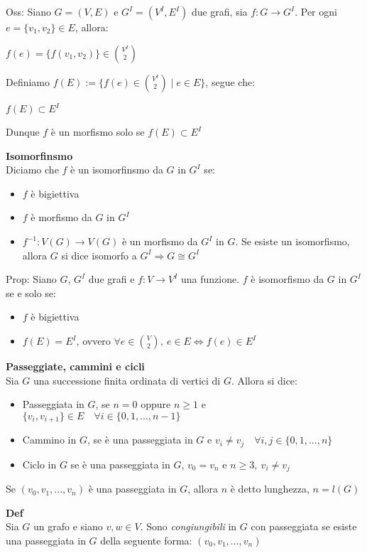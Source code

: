 \documentclass[11pt, letterpaper]{article}
\begin{document}
Oss: Siano $G=(V,E)$ e $G^{I}=(V^{I},E^{I})$ due grafi, sia $f:G\rightarrow G^{I}$. Per ogni 
$e=\{v_{1},v_{2}\}\in E$, allora:
\begin{center}
    $f(e)=\{f(v_{1},v_{2})\}\in\binom{V^{I}}{2}$
\end{center}
Definiamo $f(E):=\{f(e)\in\binom{V^{I}}{2}\mid e\in E\}$, segue che:
\begin{center}
    $f(E)\subset E^{I}$
\end{center}
Dunque $f$ è un morfismo solo se $f(E)\subset E^{I}$

\textbf{Isomorfinsmo}\\ Diciamo che $f$ è un isomorfinsmo da $G$ in $G^{I}$ se:
\begin{itemize}
    \item $f$ è bigiettiva
    \item $f$ è morfismo da $G$ in $G^{I}$
    \item $f^{-1}:V(G)\rightarrow V(G)$ è un morfismo da $G^{I}$ in $G$. Se esiste un isomorfismo, allora
    $G$ si dice isomorfo a $G^{I}\Rightarrow G\cong G^{I}$
\end{itemize}

Prop: Siano $G$, $G^{I}$ due grafi e $f:V\rightarrow V^{I}$ una funzione. $f$ è isomorfismo da $G$ in $G^{I}$ 
se e solo se:
\begin{itemize}
    \item $f$ è bigiettiva
    \item $f(E)=E^{I}$, ovvero $\forall e\in\binom{V}{2},\ e\in E\Leftrightarrow f(e)\in E^{I}$
\end{itemize}

\newpage
\textbf{Passeggiate, cammini e cicli}\\ Sia $G$ una successione finita ordinata di vertici di $G$. Allora si dice:
\begin{itemize}
    \item Passeggiata in $G$, se $n=0$ oppure $n\geq 1$ e $\{v_{i},v_{i+1}\}\in E\quad\forall i\in\{0,1,...,n-1\}$
    \item Cammino in $G$, se è una passeggiata in $G$ e $v_{i}\neq v_{j}\quad\forall i,j\in\{0,1,...,n\}$
    \item Ciclo in $G$ se è una passeggiata in $G$, $v_{0}=v_{n}$ e $n\geq 3,\ v_{i}\neq v_{j}$
\end{itemize}
Se $(v_{0},v_{1},...,v_{n})$ è una passeggiata in $G$, allora $n$ è detto lunghezza, $n=l(G)$

\textbf{Def}\\ Sia $G$ un grafo e siano $v,w\in V$. Sono \textit{congiungibili} in $G$ con passeggiata se 
esiste una passeggiata in $G$ della seguente forma: $(v_{0},v_{1},...,v_{n})$
\end{document}
